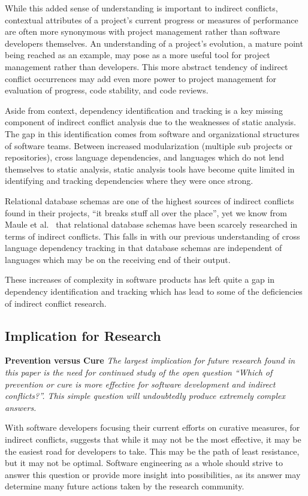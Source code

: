 \documentclass[conference]{IEEEtran}
\begin{document}
While this added sense of understanding is important to indirect conflicts, contextual attributes of a project's current progress
or measures of performance are often more synonymous with project management
rather than software developers themselves. An understanding of a project's evolution, a mature point being reached as an example,
may pose as a more useful tool for project management rather than developers. This more abstract tendency of indirect
conflict occurrences may add even more power to project management for evaluation of progress, code stability, and code reviews.

Aside from context, dependency identification and tracking is a key missing component of
indirect conflict analysis due to the weaknesses of static analysis. The gap in this identification comes from software and 
organizational structures of software teams. Between increased modularization (multiple sub projects or repositories), 
cross language dependencies, and languages which do not lend themselves to static analysis, static analysis tools have 
become quite limited in identifying and tracking dependencies where they were once strong.

Relational database schemas are one of the highest sources of indirect
conflicts found in their projects, ``it breaks stuff all over the place'',
yet we know from Maule et al.~\cite{Maule:2008:IAD} that relational database schemas have 
been scarcely researched in terms of indirect conflicts. This falls in with our previous understanding of cross language
dependency tracking in that database schemas are independent of languages which may be on the receiving end of their output.

These increases of complexity in software products has left quite a gap in dependency identification and tracking which 
has lead to some of the deficiencies of indirect conflict research.


\subsection{Implication for Research}
\label{sec:implr}

\textbf{Prevention versus Cure} \textit{The largest implication for future research found in this paper is the need for continued study of the open question
``Which of prevention or cure is more effective for software development and indirect conflicts?''. This simple question will undoubtedly 
produce extremely complex answers.}

With software developers focusing their current efforts on curative measures, for
indirect conflicts, suggests
that while it may not be the most effective, it may be the easiest road for developers to take. This may be the path of
least resistance, but it may not be optimal. Software engineering as a whole should strive to answer this question or
provide more insight into possibilities, as its answer may determine many future actions taken by the research community.
\end{document}
